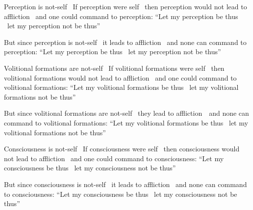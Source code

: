 \begin{english-only-hang}
  Perception is not-self \breathmark\ If perception were self \breathmark\ then perception would not lead to affliction \breathmark\ and one could command to perception: ``Let my perception be thus \breathmark\ let my perception not be thus''
\end{english-only-hang}
\begin{english-only-hang-together}
  But since perception is not-self \breathmark\ it leads to affliction \breathmark\ and none can command to perception: ``Let my perception be thus \breathmark\ let my perception not be thus''
\end{english-only-hang-together}

\begin{english-only-hang}
  Volitional formations are not-self \breathmark\ If volitional formations were self \breathmark\ then volitional formations would not lead to affliction \breathmark\ and one could command to volitional formations: ``Let my volitional formations be thus \breathmark\ let my volitional formations not be thus''
\end{english-only-hang}
\begin{english-only-hang-together}
  But since volitional formations are not-self \breathmark\ they lead to \mbox{affliction}~\breathmark\ and none can command to volitional formations: ``Let my volitional formations be thus \breathmark\ let my volitional formations not be thus''
\end{english-only-hang-together}

\begin{english-only-hang}
  Consciousness is not-self \breathmark\ If consciousness were self \breathmark\ then consciousness would not lead to affliction \breathmark\ and one could command to consciousness: ``Let my consciousness be thus \breathmark\ let my consciousness not be thus''
\end{english-only-hang}
\begin{english-only-hang-together}
  But since consciousness is not-self \breathmark\ it leads to affliction \breathmark\ and none can command to consciousness: ``Let my consciousness be thus \breathmark\ let my consciousness not be thus''
\end{english-only-hang-together}

